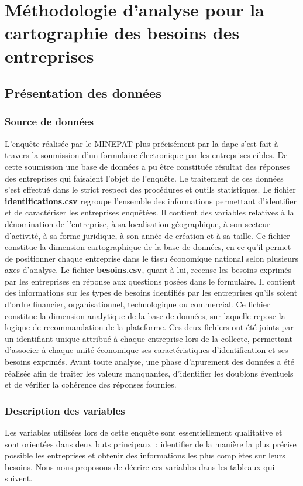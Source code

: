 \documentclass[12pt, a4paper, oneside]{report}
\begin{document}
	\section{Méthodologie d'analyse pour la cartographie des besoins des entreprises}
	
	\subsection{Présentation des données}
	\subsubsection{Source de données}
	L’enquête réalisée par le MINEPAT plus précisément par la \gls{dape} s’est fait à travers la soumission d’un formulaire électronique par les entreprises cibles. De cette soumission une base de données a pu être constituée résultat des réponses des entreprises qui faisaient l’objet de l’enquête. Le traitement de ces données s’est effectué dans le strict respect des procédures et outils statistiques. Le fichier \textbf{identifications.csv} regroupe l'ensemble des informations permettant d'identifier et de caractériser les entreprises enquêtées. Il contient des variables relatives à la dénomination de l'entreprise, à sa localisation géographique, à son secteur d'activité, à sa forme juridique, à son année de création et à sa taille. Ce fichier constitue la dimension cartographique de la base de données, en ce qu'il permet de positionner chaque entreprise dans le tissu économique national selon plusieurs axes d'analyse. Le fichier \textbf{besoins.csv}, quant à lui, recense les besoins exprimés par les entreprises en réponse aux questions posées dans le formulaire. Il contient des informations sur les types de besoins identifiés par les entreprises qu'ils soient d'ordre financier, organisationnel, technologique ou commercial. Ce fichier constitue la dimension analytique de la base de données, sur laquelle repose la logique de recommandation de la plateforme.  Ces deux fichiers ont été joints par un identifiant unique attribué à chaque entreprise lors de la collecte, permettant d'associer à chaque unité économique ses caractéristiques d'identification et ses besoins exprimés. Avant toute analyse, une phase d'apurement des données a été réalisée afin de traiter les valeurs manquantes, d'identifier les doublons éventuels et de vérifier la cohérence des réponses fournies.
	\subsubsection{Description des variables}
	Les variables utilisées lors de cette enquête sont essentiellement qualitative et sont orientées dans deux buts principaux : identifier de la manière la plus précise possible les entreprises et obtenir des informations les plus complètes sur leurs besoins. Nous nous proposons de décrire ces variables dans les tableaux qui suivent.
	
\end{document}
